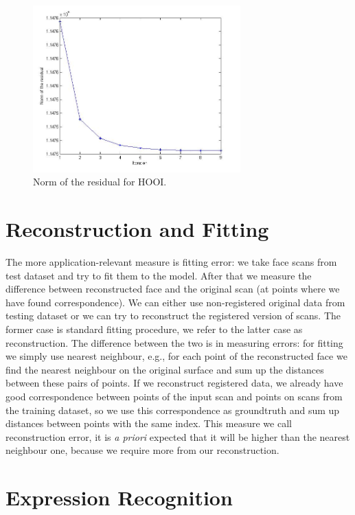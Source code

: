 \begin{figure}
        \centering
                \includegraphics[width=8cm]{images/hooi_residual_plot.jpg}
        \caption{Norm of the residual for HOOI.}
        \label{fig:hooi_resid_plot}
\end{figure}

\section{Reconstruction and Fitting}
\label{eval_fit}
The more application-relevant measure is fitting error: we take face scans
from test dataset and try to fit them to the model. After that we measure the difference
between reconstructed face and the original scan (at points where we have found correspondence).
We can either use non-registered original data from testing dataset
or we can try to reconstruct the registered version of scans. The former case is 
standard fitting procedure, we refer to the latter case as reconstruction. The difference
between the two is in measuring errors: for fitting we simply use nearest neighbour,
e.g., for each point of the reconstructed face we find the nearest neighbour on the
original surface and sum up the distances between these pairs of points.
If we reconstruct registered data, we already have good correspondence
between points of the input scan and points on scans from the training dataset,
so we use this correspondence as groundtruth and sum up distances between 
points with the same index. This measure we call reconstruction error,
it is \textit{a priori} expected that it will be higher than the nearest neighbour
one, because we require more from our reconstruction.



\section{Expression Recognition}

